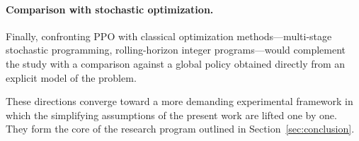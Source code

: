 \paragraph{Comparison with stochastic optimization.}
Finally, confronting PPO with classical optimization methods---multi-stage stochastic programming, rolling-horizon integer programs---would complement the study with a comparison against a global policy obtained directly from an explicit model of the problem.

\bigskip
\noindent
These directions converge toward a more demanding experimental framework in which the simplifying assumptions of the present work are lifted one by one. They form the core of the research program outlined in Section~\ref{sec:conclusion}.
